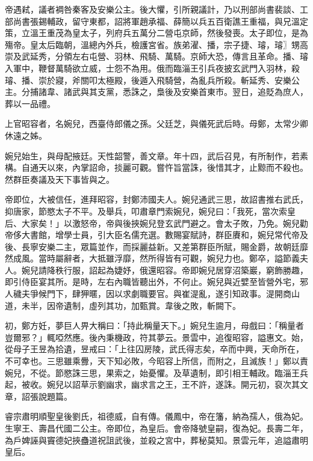 \begin{pinyinscope}
 帝遇弒，議者裯咎秦客及安樂公主。後大懼，引所親議計，乃以刑部尚書裴談、工部尚書張錫輔政，留守東都，詔將軍趙承福、薛簡以兵五百衛譙王重福，與兄溫定策，立溫王重茂為皇太子，列府兵五萬分二營屯京師，然後發喪。太子即位，是為殤帝。皇太后臨朝，溫總內外兵，檢護宮省。族弟濯、播，宗子捷、璿，璿〗甥高崇及武延秀，分領左右屯營、羽林、飛騎、萬騎。京師大恐，傳言且革命。播、璿入軍中，鞭督萬騎欲立威，士怨不為用。俄而臨淄王引兵夜披玄武門入羽林，殺璿、播、崇於寢，斧關叩太極殿，後遁入飛騎營，為亂兵所殺。斬延秀、安樂公主。分捕諸韋、諸武與其支黨，悉誅之，梟後及安樂首東市。翌日，追貶為庶人，葬以一品禮。



 上官昭容者，名婉兒，西臺侍郎儀之孫。父廷芝，與儀死武后時。母鄭，太常少卿休遠之姊。



 婉兒始生，與母配掖廷。天性韶警，善文章。年十四，武后召見，有所制作，若素構。自通天以來，內掌詔命，掞麗可觀。嘗忤旨當誅，後惜其才，止黥而不殺也。然群臣奏議及天下事皆與之。



 帝即位，大被信任，進拜昭容，封鄭沛國夫人。婉兒通武三思，故詔書推右武氏，抑唐家，節愍太子不平。及舉兵，叩肅章門索婉兒，婉兒曰：「我死，當次索皇后、大家矣！」以激怒帝，帝與後挾婉兒登玄武門避之。會太子敗，乃免。婉兒勸帝侈大書館，增學士員，引大臣名儒充選。數賜宴賦詩，群臣賡和，婉兒常代帝及後、長寧安樂二主，眾篇並作，而採麗益新。又差第群臣所賦，賜金爵，故朝廷靡然成風。當時屬辭者，大抵雖浮靡，然所得皆有可觀，婉兒力也。鄭卒，謚節義夫人。婉兒請降秩行服，詔起為婕妤，俄還昭容。帝即婉兒居穿沼築巖，窮飾勝趣，即引侍臣宴其所。是時，左右內職皆聽出外，不何止。婉兒與近嬖至皆營外宅，邪人穢夫爭候門下，肆狎暱，因以求劇職要官。與崔湜亂，遂引知政事。湜開商山道，未半，因帝遺制，虛列其功，加甄賞。韋後之敗，斬闕下。



 初，鄭方妊，夢巨人畀大稱曰：「持此稱量天下。」婉兒生逾月，母戲曰：「稱量者豈爾邪？」輒啞然應。後內秉機政，符其夢云。景雲中，追復昭容，謚惠文。始，從母子王昱為拾遺，昱戒曰：「上往囚房陵，武氏得志矣，卒而中興，天命所在，不可幸也。三思雖乘釁，天下知必敗，今昭容上所信，而附之，且滅族！」鄭以責婉兒，不從。節愍誅三思，果索之，始憂懼。及草遺制，即引相王輔政。臨淄王兵起，被收。婉兒以詔草示劉幽求，幽求言之王，王不許，遂誅。開元初，裒次其文章，詔張說題篇。



 睿宗肅明順聖皇後劉氏，祖德威，自有傳。儀鳳中，帝在籓，納為孺人，俄為妃。生寧王、壽昌代國二公主。帝即位，為皇后。會帝降號皇嗣，復為妃。長壽二年，為戶婢誣與竇德妃挾蠱道祝詛武後，並殺之宮中，葬秘莫知。景雲元年，追謚肅明皇后。




\end{pinyinscope}
